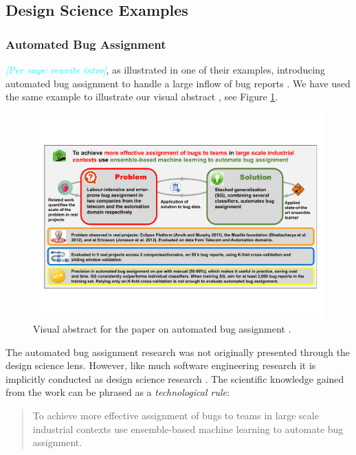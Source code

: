 \documentclass[graybox]{svmult}
\newcommand{\per}[1]{\textcolor{cyan}{{\it [Per says: #1]}}}
\newcommand{\per}[1]{}
\begin{document}
\subsection{Design Science Examples}
\label{sec:examples}
\subsubsection{Automated Bug Assignment}
\per{rewrite intro}, as illustrated in one of their examples, introducing automated bug assignment to handle a large inflow of bug reports \cite{JonssonBug15}. We have used the same example to illustrate our visual abstract \cite{StoreyESEM17}, see Figure \ref{fig:BugAssignment}.

\begin{figure}[t]
\begin{center}
\includegraphics[width=\columnwidth, trim={7mm 30mm 7mm 30mm },clip]{Figures/VATemplateJonsson.pdf}
\caption{Visual abstract for the paper on automated bug assignment \cite{JonssonBug15}.}
\label{fig:BugAssignment}
\end{center}
\end{figure}

The automated bug assignment research was not originally presented through the design science lens. However, like much software engineering research it is implicitly conducted as design science research \cite{Engstrom19arxiv}. 
The scientific knowledge gained from the work can be phrased as a \emph{technological rule}:
\begin{quote}{To achieve more effective assignment of bugs to teams in large scale industrial contexts use ensemble-based machine learning to automate bug assignment. \cite{StoreyESEM17}}\end{quote}
\end{document}
